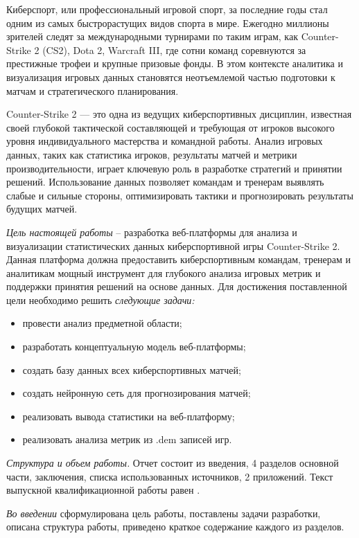 \newsection
{}

Киберспорт, или профессиональный игровой спорт, за последние годы стал одним из самых быстрорастущих видов спорта в мире. Ежегодно миллионы зрителей следят за международными турнирами по таким играм, как Counter-Strike 2 (CS2), Dota 2, Warcraft III, где сотни команд соревнуются за престижные трофеи и крупные призовые фонды. В этом контексте аналитика и визуализация игровых данных становятся неотъемлемой частью подготовки к матчам и стратегического планирования.

Counter-Strike 2 — это одна из ведущих киберспортивных дисциплин, известная своей глубокой тактической составляющей и требующая от игроков высокого уровня индивидуального мастерства и командной работы. Анализ игровых данных, таких как статистика игроков, результаты матчей и метрики производительности, играет ключевую роль в разработке стратегий и принятии решений. Использование данных позволяет командам и тренерам выявлять слабые и сильные стороны, оптимизировать тактики и прогнозировать результаты будущих матчей.

\emph{Цель настоящей работы} – разработка веб-платформы для анализа и визуализации статистических данных киберспортивной игры Counter-Strike 2. Данная платформа должна предоставить киберспортивным командам, тренерам и аналитикам мощный инструмент для глубокого анализа игровых метрик и поддержки принятия решений на основе данных. Для достижения поставленной цели необходимо решить \emph{следующие задачи:}
\begin{itemize}
\item провести анализ предметной области;
\item разработать концептуальную модель веб-платформы;
\item создать базу данных всех киберспортивных матчей;
\item создать нейронную сеть для прогнозирования матчей;
\item реализовать вывода статистики на веб-платформу;
\item реализовать анализа метрик из .dem записей игр.
\end{itemize}

\emph{Структура и объем работы.} Отчет состоит из введения, 4 разделов основной части, заключения, списка использованных источников, 2 приложений. Текст выпускной квалификационной работы равен .

\emph{Во введении} сформулирована цель работы, поставлены задачи разработки, описана структура работы, приведено краткое содержание каждого из разделов.

